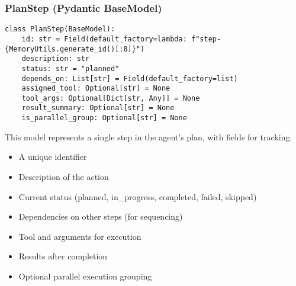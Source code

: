 \documentclass[12pt,a4paper]{article}
\begin{document}
\subsubsection*{PlanStep (Pydantic BaseModel)}
\begin{pageablecode}
\begin{verbatim}
class PlanStep(BaseModel):
    id: str = Field(default_factory=lambda: f"step-{MemoryUtils.generate_id()[:8]}")
    description: str
    status: str = "planned"
    depends_on: List[str] = Field(default_factory=list)
    assigned_tool: Optional[str] = None
    tool_args: Optional[Dict[str, Any]] = None
    result_summary: Optional[str] = None
    is_parallel_group: Optional[str] = None
\end{verbatim}
\end{pageablecode}
This model represents a single step in the agent's plan, with fields for tracking:
\begin{itemize}
    \item A unique identifier
    \item Description of the action
    \item Current status (planned, in\_progress, completed, failed, skipped)
    \item Dependencies on other steps (for sequencing)
    \item Tool and arguments for execution
    \item Results after completion
    \item Optional parallel execution grouping
\end{itemize}
\end{document}
